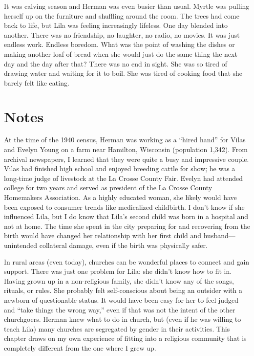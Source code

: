 \documentclass[
  american,
  letterpaper,
]{book}
\begin{document}
It was calving season and Herman was even busier than usual. Myrtle was
pulling herself up on the furniture and shuffling around the room. The
trees had come back to life, but Lila was feeling increasingly lifeless.
One day blended into another. There was no friendship, no laughter, no
radio, no movies. It was just endless work. Endless boredom. What was
the point of washing the dishes or making another loaf of bread when she
would just do the same thing the next day and the day after that? There
was no end in sight. She was so tired of drawing water and waiting for
it to boil. She was tired of cooking food that she barely felt like
eating.

\section{Notes}\label{notes-38}

At the time of the 1940 census, Herman was working as a ``hired hand''
for Vilas and Evelyn Young on a farm near Hamilton, Wisconsin
(population 1,342). From archival newspapers, I learned that they were
quite a busy and impressive couple. Vilas had finished high school and
enjoyed breeding cattle for show; he was a long-time judge of livestock
at the La Crosse County Fair. Evelyn had attended college for two years
and served as president of the La Crosse County Homemakers Association.
As a highly educated woman, she likely would have been exposed to
consumer trends like medicalized childbirth. I don't know if she
influenced Lila, but I do know that Lila's second child was born in a
hospital and not at home. The time she spent in the city preparing for
and recovering from the birth would have changed her relationship with
her first child and husband---unintended collateral damage, even if the
birth was physically safer.

In rural areas (even today), churches can be wonderful places to connect
and gain support. There was just one problem for Lila: she didn't know
how to fit in. Having grown up in a non-religious family, she didn't
know any of the songs, rituals, or rules. She probably felt
self-conscious about being an outsider with a newborn of questionable
status. It would have been easy for her to feel judged and ``take things
the wrong way,'' even if that was not the intent of the other
churchgoers. Herman knew what to do in church, but (even if he was
willing to teach Lila) many churches are segregated by gender in their
activities. This chapter draws on my own experience of fitting into a
religious community that is completely different from the one where I
grew up.
\end{document}
